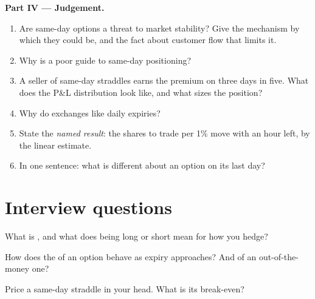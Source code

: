 \begin{problem}
\medskip\noindent\textbf{Part IV --- Judgement.}
\begin{enumerate}[resume]
\item Are same-day options a threat to market stability? Give the mechanism
by which they could be, and the fact about customer flow that limits it.
\item Why is  a poor guide to same-day positioning?
\item A seller of same-day straddles earns the premium on three days in
five. What does the P\&L distribution look like, and what sizes the
position?
\item Why do exchanges like daily expiries?
\item State the \emph{named result}: the shares to trade per 1\% move with an
hour left, by the linear estimate.
\item In one sentence: what is different about an option on its last day?
\end{enumerate}
\end{problem}

\section{Interview questions}

\begin{interviewq}\label{iq:m1:zero-day-options-and-retail-flow:1}
What is , and what does being long or short  mean for how you
hedge?
\end{interviewq}

\begin{interviewq}\label{iq:m1:zero-day-options-and-retail-flow:2}
How does the  of an  option behave as expiry approaches?
And of an out-of-the-money one?
\end{interviewq}

\begin{interviewq}\label{iq:m1:zero-day-options-and-retail-flow:3}
Price a same-day  straddle in your head. What is its break-even?
\end{interviewq}

